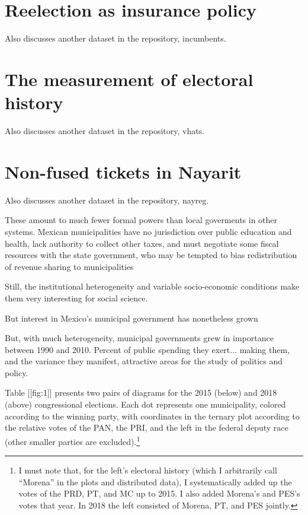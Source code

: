 \documentclass[letter,12pt]{article}
\begin{document}
\section{Reelection as insurance policy}
Also discusses another dataset in the repository, incumbents. \citep{motolinia-reel-pork2021,lucardi.rosas.Incumbency.2016}

\section{The measurement of electoral history}
Also discusses another dataset in the repository, vhats.

\section{Non-fused tickets in Nayarit}
Also discusses another dataset in the repository, nayreg.





These amount to much fewer formal powers than local goverments in other systems. Mexican municipalities have no jurisdiction over public education and health, lack authority to collect other taxes, and must negotiate some fiscal resources with the state government, who may be tempted to bias redistribution of revenue sharing to municipalities \citep{timmons.broid.2013} 

Still, the institutional heterogeneity and variable socio-economic conditions make them very interesting for social science. 

But interest in Mexico's municipal government has nonetheless grown

But, with much heterogeneity, municipal governments grew in importance between 1990 and 2010. Percent of public spending they exert... making them, and the variance they manifest, attractive areas for the study of politics and policy. 






Table [[fig:1]] presents two pairs of diagrams for the 2015 (below) and 2018 (above) congressional elections. Each dot represents one municipality, colored according to the winning party, with coordinates in the ternary plot according to the relative votes of the PAN, the PRI, and the left in the federal deputy race (other smaller parties are excluded).\footnote{I must note that, for the left's electoral history (which I arbitrarily call ``Morena'' in the plots and distributed data), I systematically added up the votes of the PRD, PT, and MC up to 2015. I also added Morena's and PES's votes that year. In 2018 the left consisted of Morena, PT, and PES jointly.} 
\end{document}
